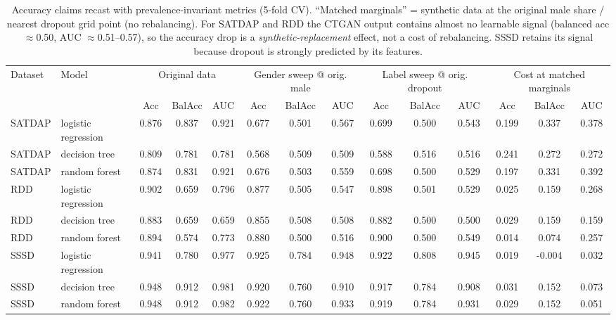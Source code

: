 \begin{table}[ht]
\centering\footnotesize
\caption{Accuracy claims recast with prevalence-invariant metrics (5-fold CV).
``Matched marginals'' = synthetic data at the original male share / nearest
dropout grid point (no rebalancing). For SATDAP and RDD the CTGAN output
contains almost no learnable signal (balanced acc $\approx$0.50, AUC $\approx$0.51--0.57),
so the accuracy drop is a \emph{synthetic-replacement} effect, not a cost of
rebalancing. SSSD retains its signal because dropout is strongly predicted by
its features.}
\label{tab:recast_costs}
\begin{tabular}{l l c c c c c c c c c c c c}
\toprule
\multirow{2}{*}{Dataset} & \multirow{2}{*}{Model} &
\multicolumn{3}{c}{Original data} &
\multicolumn{3}{c}{Gender sweep @ orig. male} &
\multicolumn{3}{c}{Label sweep @ orig. dropout} &
\multicolumn{3}{c}{Cost at matched marginals} \\
 & & Acc & BalAcc & AUC & Acc & BalAcc & AUC & Acc & BalAcc & AUC & Acc & BalAcc & AUC \\
\midrule
SATDAP & logistic regression & 0.876 & 0.837 & 0.921 & 0.677 & 0.501 & 0.567 & 0.699 & 0.500 & 0.543 & 0.199 & 0.337 & 0.378 \\
SATDAP & decision tree & 0.809 & 0.781 & 0.781 & 0.568 & 0.509 & 0.509 & 0.588 & 0.516 & 0.516 & 0.241 & 0.272 & 0.272 \\
SATDAP & random forest & 0.874 & 0.831 & 0.921 & 0.676 & 0.503 & 0.559 & 0.698 & 0.500 & 0.529 & 0.197 & 0.331 & 0.392 \\
RDD & logistic regression & 0.902 & 0.659 & 0.796 & 0.877 & 0.505 & 0.547 & 0.898 & 0.501 & 0.529 & 0.025 & 0.159 & 0.268 \\
RDD & decision tree & 0.883 & 0.659 & 0.659 & 0.855 & 0.508 & 0.508 & 0.882 & 0.500 & 0.500 & 0.029 & 0.159 & 0.159 \\
RDD & random forest & 0.894 & 0.574 & 0.773 & 0.880 & 0.500 & 0.516 & 0.900 & 0.500 & 0.549 & 0.014 & 0.074 & 0.257 \\
SSSD & logistic regression & 0.941 & 0.780 & 0.977 & 0.925 & 0.784 & 0.948 & 0.922 & 0.808 & 0.945 & 0.019 & -0.004 & 0.032 \\
SSSD & decision tree & 0.948 & 0.912 & 0.981 & 0.920 & 0.760 & 0.910 & 0.917 & 0.784 & 0.908 & 0.031 & 0.152 & 0.073 \\
SSSD & random forest & 0.948 & 0.912 & 0.982 & 0.922 & 0.760 & 0.933 & 0.919 & 0.784 & 0.931 & 0.029 & 0.152 & 0.051 \\
\bottomrule
\end{tabular}
\end{table}
